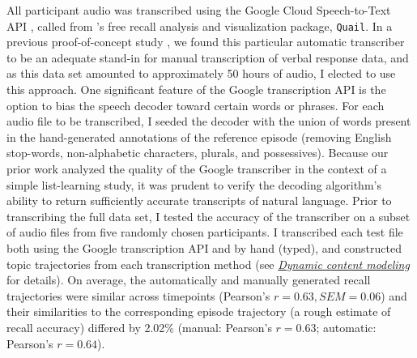 \documentclass{article}
\begin{document}
All participant audio was transcribed using the Google Cloud Speech-to-Text API \citep{HalpEtal16}, called from \cite{HeusEtal17b}'s free recall analysis and visualization package, \texttt{Quail}.  In a previous proof-of-concept study \citep{ZimaEtal18}, we found this particular automatic transcriber to be an adequate stand-in for manual transcription of verbal response data, and as this data set amounted to approximately 50 hours of audio, I elected to use this approach.  One significant feature of the Google transcription API is the option to bias the speech decoder toward certain words or phrases.  For each audio file to be transcribed, I seeded the decoder with the union of words present in the hand-generated annotations of the reference episode (removing English stop-words, non-alphabetic characters, plurals, and possessives).  Because our prior work analyzed the quality of the Google transcriber in the context of a simple list-learning study, it was prudent to verify the decoding algorithm's ability to return sufficiently accurate transcripts of natural language.  Prior to transcribing the full data set, I tested the accuracy of the transcriber on a subset of audio files from five randomly chosen participants.  I transcribed each test file both using the Google transcription API and by hand (typed), and constructed topic trajectories from each transcription method (see \hyperref[sec:topicmodeling]{\textit{Dynamic content modeling}} for details).  On average, the automatically and manually generated recall trajectories were similar across timepoints (Pearson's $r=0.63, SEM=0.06$) and their similarities to the corresponding episode trajectory (a rough estimate of recall accuracy) differed by 2.02\% (manual: Pearson's $r=0.63$; automatic: Pearson's $r=0.64$).
\end{document}
